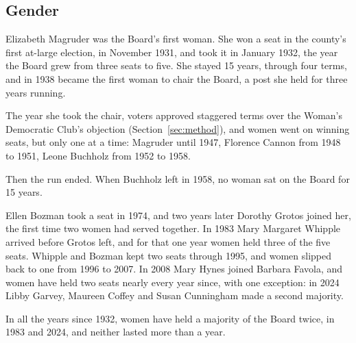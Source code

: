 \subsection{Gender}

Elizabeth Magruder was the Board's first woman. She won a seat in the county's
first at-large election, in November 1931, and took it in January 1932, the year
the Board grew from three seats to five. She stayed 15 years, through four terms,
and in 1938 became the first woman to chair the Board, a post she held for three
years running.\autocite{arlingtonva2026members}

The year she took the chair, voters approved staggered terms over the Woman's
Democratic Club's objection (Section~\ref{sec:method}), and women went on winning
seats, but only one at a time: Magruder until 1947, Florence Cannon from 1948 to 1951, Leone Buchholz from
1952 to 1958.

Then the run ended. When Buchholz left in 1958, no woman sat on the Board for 15
years.

Ellen Bozman took a seat in 1974, and two years later Dorothy Grotos joined her,
the first time two women had served together. In 1983 Mary Margaret Whipple
arrived before Grotos left, and for that one year women held three of the five
seats. Whipple and Bozman kept two seats through 1995, and women slipped back to
one from 1996 to 2007. In 2008 Mary Hynes joined Barbara Favola, and women have
held two seats nearly every year since, with one exception: in 2024 Libby Garvey,
Maureen Coffey and Susan Cunningham made a second majority.

In all the years since 1932, women have held a majority of the Board twice, in
1983 and 2024, and neither lasted more than a year.


